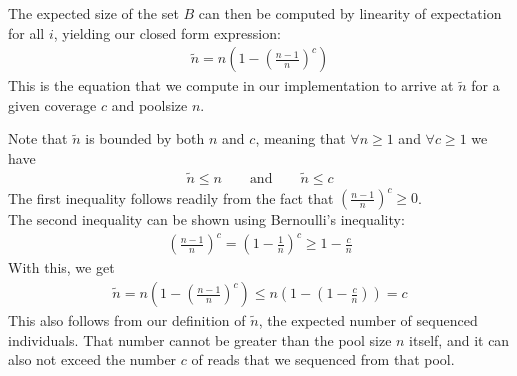 \documentclass[a4paper,fontsize=9pt,DIV=14]{scrartcl}
\newcounter{todo}
\newcommand\todo[1]{}
\newcommand{\coverage}{c}
\begin{document}
The expected size of the set $B$ can then be computed by linearity of expectation for all $i$,
yielding our closed form expression:
%
%
\begin{align}
    \label{eq:NTildeClosedForm}
    \tilde{n} = n \left( 1 - \left( \frac{n-1}{n} \right)^\coverage \right)
\end{align}
%
This is the equation that we compute in our implementation to arrive at $\tilde{n}$ for a given coverage $\coverage$ and poolsize $n$.

Note that $\tilde{n}$ is bounded by both $n$ and $c$, meaning that $\forall n \geq 1$ and $\forall c \geq 1$ we have
\begin{align}
    \label{eq:NTildeBounds}
     \tilde{n} \leq n \qquad\mbox{and}\qquad \tilde{n} \leq c
\end{align}
The first inequality follows readily from the fact that $(\frac{n-1}{n})^c \ge 0$. \\
The second inequality can be shown using Bernoulli's inequality:
\begin{align}
     \left( \frac{n-1}{n} \right)^c = \left(1 - \frac{1}{n} \right)^c \geq 1 - \frac{c}{n}
\end{align}
With this, we get
\begin{align}
    \tilde{n} = n \left( 1 - \left( \frac{n-1}{n} \right)^\coverage \right) \leq n \left( 1 - \left( 1 - \frac{c}{n} \right) \right) = c
\end{align}
This also follows from our definition of $\tilde{n}$, the expected number of sequenced individuals. That number cannot be greater than the pool size $n$ itself, and it can also not exceed the number $c$ of reads that we sequenced from that pool.


\todo{UNRESOLVED ISSUE: This is computed using the coverage $\coverage$ in the above equations (and in the PoPoolation equations), but seems to be called with $b$ (min coverage) in their code (and in mine). Jeff, is that yet another bug (number three then, on top of the two already mentioned two sections below) that they introduced in their code? it seems weird to compute this based on the min coverage, than the actual coverage at the site.  JPS: I'm actually not totally sure what the PoPoolation people are doing here.  I guess they're plugging an estimate of $n$ into the f alpha and beta, which is fine, but could be biased.  My guess is that you would want to use $\coverage$ and not $b$, but as I said I'm not totally sure what they're doing here. Update 1/4/23 -- I think that they should be using $c$ here and not $b$. But, I should say that just plugging in an estimate for $n$ in the Achaz equations will result in some bias as equations 20, 21, and 22 are nonlinear in n.}
\end{document}
